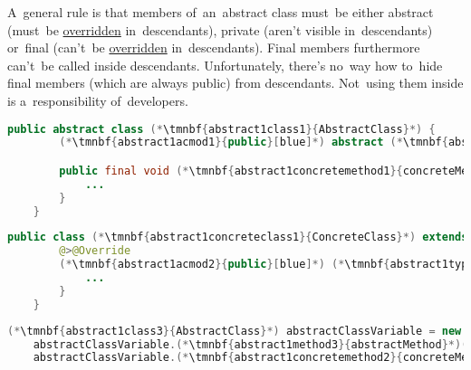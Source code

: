 A~general rule is that members of~an~abstract class must~be either abstract (must~be \hyperref[javaoverride]{overridden} in~descendants), private (aren't visible in~descendants) or~final (can't~be \hyperref[javaoverride]{overridden} in~descendants).
Final members furthermore can't~be called inside descendants.
Unfortunately, there's no~way how to~hide final members (which are always public) from descendants.
Not~using them inside is a~responsibility of~developers.
\newpage

\begin{lstlisting}[language=Java, title={Abstract class}]
    public abstract class (*\tmnbf{abstract1class1}{AbstractClass}*) {
        (*\tmnbf{abstract1acmod1}{public}[blue]*) abstract (*\tmnbf{abstract1type1}{void}[blue]*) (*\tmnbf{abstract1method1}{abstractMethod}*)((*\tmnbf{abstract1paramtype1}{Object}*) (*\tmnbf{abstract1param1}{abstractMethodParam}*));

        public final void (*\tmnbf{abstract1concretemethod1}{concreteMethod}*)() {
            ...
        }
    }
\end{lstlisting}
\begin{lstlisting}[language=Java, title={Concrete class}]
    public class (*\tmnbf{abstract1concreteclass1}{ConcreteClass}*) extends (*\tmnbf{abstract1class2}{AbstractClass}*) {
        @>@Override
        (*\tmnbf{abstract1acmod2}{public}[blue]*) (*\tmnbf{abstract1type2}{void}[blue]*) (*\tmnbf{abstract1method2}{abstractMethod}*)((*\tmnbf{abstract1paramtype2}{Object}*) (*\tmnbf{abstract1param2}{abstractMethodParam}*)) {
            ...
        }
    }
\end{lstlisting}
\begin{lstlisting}[language=Java, title={Usage -- concrete class instance in~the~variable of~the~abstract class type}]
    (*\tmnbf{abstract1class3}{AbstractClass}*) abstractClassVariable = new (*\tmnbf{abstract1concreteclass2}{ConcreteClass}*)();
    abstractClassVariable.(*\tmnbf{abstract1method3}{abstractMethod}*)((*\tmnbf{abstract1paramtype3}{Object}*) someObject);
    abstractClassVariable.(*\tmnbf{abstract1concretemethod2}{concreteMethod}*)();
\end{lstlisting}
